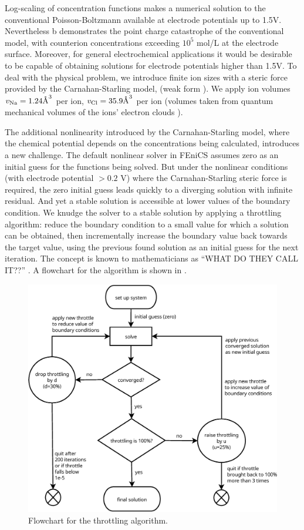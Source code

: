 Log-scaling of concentration functions makes a numerical solution to
the conventional Poisson-Boltzmann available at electrode potentials
up to 1.5V. Nevertheless b demonstrates the
point charge catastrophe of the conventional model, with counterion
concentrations exceeding $10^{5}$ mol/L at the electrode
surface. Moreover, for general electrochemical applications it would
be desirable to be capable of obtaining solutions for electrode
potentials higher than 1.5V. To deal with the physical problem, we
introduce finite ion sizes with a steric force provided by the
Carnahan-Starling model,  (weak form
).  We apply ion volumes
$v_{\ce{Na}}=1.24 \text{\AA}^{3}$ per  ion,
$v_{\ce{Cl}}=35.9 \text{\AA}^{3}$ per  ion (volumes taken from
quantum mechanical volumes of the ions' electron clouds
\cite{ParsonsNinham2009}).

The additional nonlinearity introduced by the Carnahan-Starling model,
where the chemical potential depends on the concentrations being
calculated, introduces a new challenge. The default nonlinear solver
in FEniCS assumes zero as an initial guess for the functions being
solved. But under the nonlinear conditions (with electrode potential
$>0.2$ V) where the Carnahan-Starling steric force is required, the
zero initial guess leads quickly to a diverging solution with infinite
residual. And yet a stable solution is accessible at lower values of
the boundary condition. We knudge the solver to a stable solution by
applying a throttling algorithm: reduce the boundary condition to a
small value for which a solution can be obtained, then incrementally
increase the boundary value back towards the target value, using the
previous found solution as an initial guess for the next
iteration. The concept is known to mathematicians as ``WHAT DO THEY
CALL IT??'' \cite{math_throttling}. A flowchart for the algorithm is
shown in .

\begin{figure}
\centering
\includegraphics[width=0.8\linewidth]{graphics/throttling.eps}
\caption{\label{fig_throttling_algorithm}Flowchart for the throttling algorithm. }
\end{figure}


